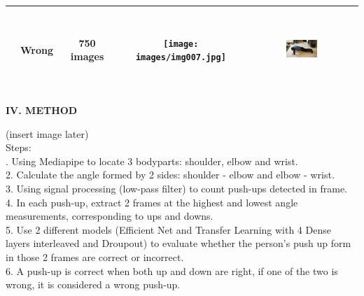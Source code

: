 \documentclass[12pt,a4paper,twoside]{article}
\begin{document}
\begin{flushleft}
\begin{flushleft}
\begin{center}
\begin{tabular}{ |c|c|c|c|c| }
 				& Wrong & 750 images & \texttt{[image: images/img007.jpg]} & \includegraphics[width=0.3\textwidth, height=30mm]{images/img008.png}\\
 				\hline
		\end{tabular}
\end{center}
			\end{flushleft}
	\end{flushleft}
	\bigskip
	\begin{flushleft}
		\textbf{IV. METHOD}
			\begin{flushleft}
			\medskip
			(insert image later)\\
			\medskip
		Steps:\\
		. Using Mediapipe to locate 3 bodyparts: shoulder, elbow and wrist.\\
		2. Calculate the angle formed by 2 sides: shoulder - elbow and elbow - wrist.\\
		3. Using signal processing (low-pass filter) to count push-ups detected in frame.\\
		4. In each push-up, extract 2 frames at the highest and lowest angle measurements, corresponding to ups and downs.\\
		5. Use 2 different models (Efficient Net and Transfer Learning with 4 Dense layers interleaved and Droupout) to evaluate whether the person's push up form in those 2 frames are correct or incorrect.\\
		6. A push-up is correct when both up and down are right, if one of the two is wrong, it is considered a wrong push-up.\\
			\end{flushleft}
	\end{flushleft}
	\bigskip
\end{document}
